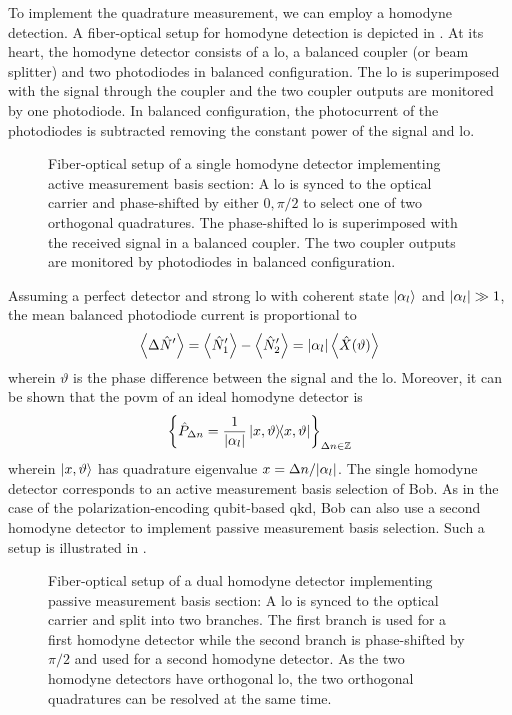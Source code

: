 To implement the quadrature measurement, we can employ a homodyne detection.
A fiber-optical setup for homodyne detection is depicted in .
At its heart, the homodyne detector consists of a \gls{lo}, a balanced coupler (or beam splitter) and two photodiodes in balanced configuration.
The \gls{lo} is superimposed with the signal through the coupler and the two coupler outputs are monitored by one photodiode.
In balanced configuration, the photocurrent of the photodiodes is subtracted removing the constant power of the signal and \gls{lo}.
\begin{figure}[htb]
	\centering
	
	\caption{Fiber-optical setup of a single homodyne detector implementing active measurement basis section: A \gls{lo} is synced to the optical carrier and phase-shifted by either $0,\pi/2$ to select one of two orthogonal quadratures. The phase-shifted \gls{lo} is superimposed with the received signal in a balanced coupler. The two coupler outputs are monitored by photodiodes in balanced configuration.}\label{fig:coherent_receiver_active}
\end{figure}
Assuming a perfect detector and strong \gls{lo} with coherent state $\ket{\alpha_l}$ and $\abs{\alpha_l}\gg1$, the mean balanced photodiode current is proportional to~\cite[p.~217]{Vogel2006}
\begin{equation}
	\expval{\Delta\hat{N}^\prime}
	=
	\expval{\hat{N}_1^\prime}
	-
	\expval{\hat{N}_2^\prime}
	=
	\abs{\alpha_l}
	\expval{\hat{X}(\vartheta)}
\end{equation}
wherein $\vartheta$ is the phase difference between the signal and the \gls{lo}.
Moreover, it can be shown that the \gls{povm} of an ideal homodyne detector is~\cite[p.~220]{Vogel2006}
\begin{equation}
	\left\{\hat{P}_{\Delta n}=\frac{1}{\abs{\alpha_l}}\ketbra{x,\vartheta}\right\}_{\Delta n\in\mathbb{Z}}
\end{equation}
wherein $\ket{x,\vartheta}$ has quadrature eigenvalue $x=\Delta n/\abs{\alpha_l}$.
The single homodyne detector corresponds to an active measurement basis selection of Bob.
As in the case of the polarization-encoding qubit-based \gls{qkd}, Bob can also use a second homodyne detector to implement passive measurement basis selection.
Such a setup is illustrated in .
\begin{figure}[htb]
	\centering
	
	\caption{Fiber-optical setup of a dual homodyne detector implementing passive measurement basis section: A \gls{lo} is synced to the optical carrier and split into two branches. The first branch is used for a first homodyne detector while the second branch is phase-shifted by $\pi/2$ and used for a second homodyne detector. As the two homodyne detectors have orthogonal \gls{lo}, the two orthogonal quadratures can be resolved at the same time.}\label{fig:coherent_receiver_passive}
\end{figure}
